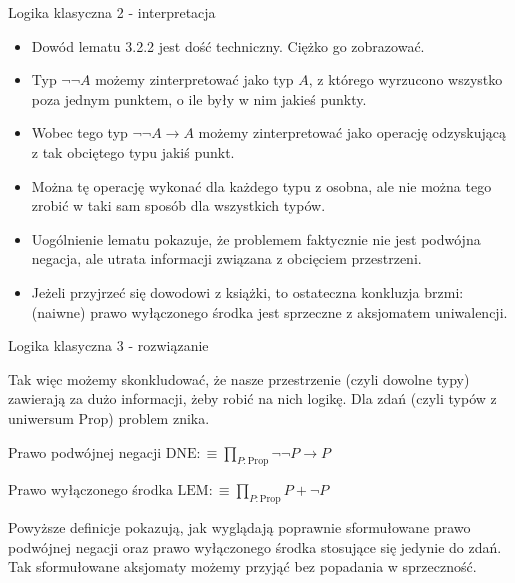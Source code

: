 \documentclass{beamer}
\newcommand{\defn}{:\equiv}
\newcommand{\Prop}{\text{Prop}}
\begin{document}
\begin{frame}{Logika klasyczna 2 - interpretacja}
\begin{itemize}
	\item Dowód lematu 3.2.2 jest dość techniczny. Ciężko go zobrazować.
	\item Typ $\neg\neg A$ możemy zinterpretować jako typ $A$, z którego wyrzucono wszystko poza jednym punktem, o ile były w nim jakieś punkty.
	\item Wobec tego typ $\neg\neg A \to A$ możemy zinterpretować jako operację odzyskującą z tak obciętego typu jakiś punkt.
	\item Można tę operację wykonać dla każdego typu z osobna, ale nie można tego zrobić w taki sam sposób dla wszystkich typów.
	\item Uogólnienie lematu pokazuje, że problemem faktycznie nie jest podwójna negacja, ale utrata informacji związana z obcięciem przestrzeni.
	\item Jeżeli przyjrzeć się dowodowi z książki, to ostateczna konkluzja brzmi: (naiwne) prawo wyłączonego środka jest sprzeczne z aksjomatem uniwalencji.
\end{itemize}
\end{frame}

\begin{frame}{Logika klasyczna 3 - rozwiązanie}

Tak więc możemy skonkludować, że nasze przestrzenie (czyli dowolne typy) zawierają za dużo informacji, żeby robić na nich logikę. Dla zdań (czyli typów z uniwersum $\Prop$) problem znika.

\begin{block}{Prawo podwójnej negacji}
$\text{DNE} \defn \prod_{P : \Prop} \neg\neg P \to P$
\end{block}

\begin{block}{Prawo wyłączonego środka}
$\text{LEM} \defn \prod_{P : \Prop} P + \neg P$
\end{block}

Powyższe definicje pokazują, jak wyglądają poprawnie sformułowane prawo podwójnej negacji oraz prawo wyłączonego środka stosujące się jedynie do zdań. Tak sformułowane aksjomaty możemy przyjąć bez popadania w sprzeczność.

\end{frame}
\end{document}
